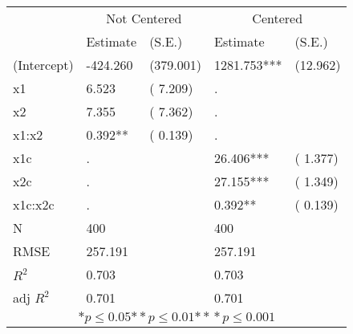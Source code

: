 \begin{tabular}{*{5}{l}}
\hline
                  & \multicolumn{2}{c}{Not Centered} & \multicolumn{2}{c}{Centered}   \tabularnewline
                   &Estimate  &(S.E.)    &Estimate  &(S.E.)  \tabularnewline
 \hline
 \hline
   (Intercept)     &-424.260   &   (379.001) &1281.753***   &   (12.962) \tabularnewline
   x1              &6.523   &   (  7.209)   & .        &         \tabularnewline
   x2              &7.355   &   (  7.362)   & .        &         \tabularnewline
   x1:x2           &0.392**   &   (  0.139)   & .        &         \tabularnewline
   x1c               & .        &         &26.406***   &   ( 1.377) \tabularnewline
   x2c               & .        &         &27.155***   &   ( 1.349) \tabularnewline
   x1c:x2c           & .        &         &0.392**   &   ( 0.139) \tabularnewline
 \hline
 N                 &400       &        &400       &        \tabularnewline
 RMSE             &257.191         & &257.191         & \tabularnewline
 $R^2$             &0.703         & &0.703         & \tabularnewline
 adj $R^2$         &0.701         & &0.701         & \tabularnewline
 \hline
\hline
 
 \multicolumn{5}{c}{${*  p}\le 0.05$${*\!\!*  p}\le 0.01$${*\!\!*\!\!*  p}\le 0.001$}\tabularnewline
 \end{tabular}